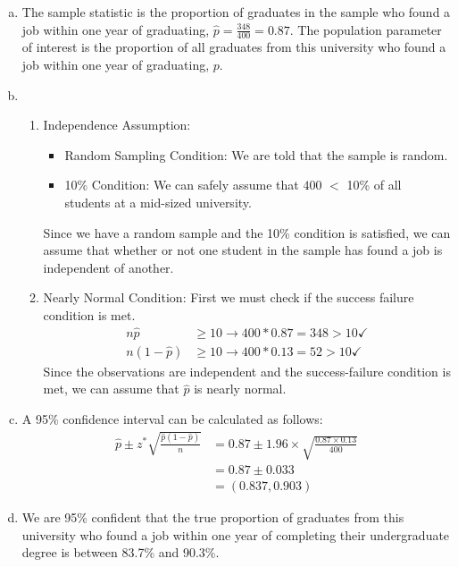 {
\begin{enumerate}[(a)]

\item The sample statistic is the proportion of graduates in the sample who found a job within one year of graduating, $\hat{p} = \frac{348}{400} = 0.87$. The population parameter of interest is the proportion of all graduates from this university who found a job within one year of graduating, $p$.

\item 
\begin{enumerate}[1.]
\item Independence Assumption: 
\begin{itemize}
\item Random Sampling Condition: We are told that the sample is random.
\item 10\% Condition: We can safely assume that $400$ $<$ 10\% of all students at a mid-sized university.
\end{itemize}
Since we have a random sample and the 10\% condition is satisfied, we can assume that whether or not one student in the sample has found a job is independent of another.
\item Nearly Normal Condition: First we must check if the success failure condition is met.
\begin{align*}
n\hat{p} &\ge 10 \rightarrow 400 * 0.87 = 348 > 10 \checkmark \\
n(1 - \hat{p}) &\ge 10 \rightarrow 400 * 0.13 = 52 > 10 \checkmark
\end{align*}
Since the observations are independent and the success-failure condition is met, we can assume that $\hat{p}$ is nearly normal.
\end{enumerate}

\item  A 95\% confidence interval can be calculated as follows:
\begin{align*}
\hat{p} \pm z^* \sqrt{ \frac{\hat{p} (1 - \hat{p})}{n} } &= 0.87 \pm 1.96 \times \sqrt{\frac{0.87 \times 0.13}{400}} \\
&= 0.87 \pm 0.033 \\
&= (0.837 , 0.903)
\end{align*}

\item We are 95\% confident that the true proportion of graduates from this university who found a job within one year of completing their undergraduate degree is between 83.7\% and 90.3\%.


\end{enumerate}}

